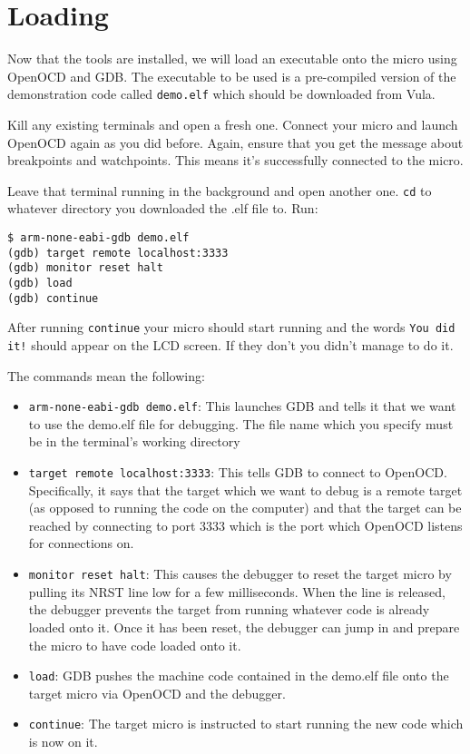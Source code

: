 \chapter{Loading}
Now that the tools are installed, we will load an executable onto the micro using OpenOCD and GDB. The executable to be used is a pre-compiled version of the demonstration code called \texttt{demo.elf} which should be downloaded from Vula.

Kill any existing terminals and open a fresh one. Connect your micro and launch OpenOCD again as you did before. Again, ensure that you get the message about breakpoints and watchpoints. This means it's successfully connected to the micro.

Leave that terminal running in the background and open another one. \texttt{cd} to whatever directory you downloaded the .elf file to. Run:
\begin{lstlisting}[style=BashStyle]
$ arm-none-eabi-gdb demo.elf
(gdb) target remote localhost:3333
(gdb) monitor reset halt
(gdb) load
(gdb) continue
\end{lstlisting}
After running \texttt{continue} your micro should start running and the words \texttt{You did it!} should appear on the LCD screen. If they don't you didn't manage to do it.

The commands mean the following:
\begin{itemize}
\item \texttt{arm-none-eabi-gdb demo.elf}: This launches GDB and tells it that we want to use the demo.elf file for debugging. The file name which you specify must be in the terminal's working directory
\item \texttt{target remote localhost:3333}: This tells GDB to connect to OpenOCD. Specifically, it says that the target which we want to debug is a remote target (as opposed to running the code on the computer) and that the target can be reached by connecting to port 3333 which is the port which OpenOCD listens for connections on.
\item \texttt{monitor reset halt}: This causes the debugger to reset the target micro by pulling its NRST line low for a few milliseconds. When the line is released, the debugger prevents the target from running whatever code is already loaded onto it. Once it has been reset, the debugger can jump in and prepare the micro to have code loaded onto it.
\item \texttt{load}: GDB pushes the machine code contained in the demo.elf file onto the target micro via OpenOCD and the debugger.
\item \texttt{continue}: The target micro is instructed to start running the new code which is now on it.
\end{itemize}

